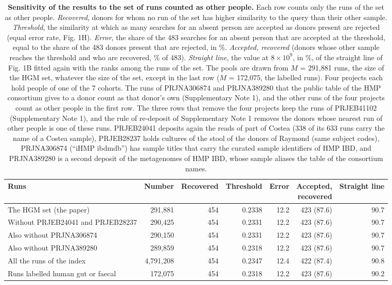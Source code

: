 \documentclass[11pt,a4paper]{article}
\begin{document}
\setcounter{table}{3}
\begin{table}[!htbp]\centering\footnotesize\setlength{\tabcolsep}{4pt}
\caption[Sensitivity of the results to the set of runs counted as other people]{\textbf{Sensitivity of the results to the set of runs counted as other people.} Each row counts only the runs of the set as other people. \textit{Recovered}, donors for whom no run of the set has higher similarity to the query than their other sample. \textit{Threshold}, the similarity at which as many searches for an absent person are accepted as donors present are rejected (equal error rate, Fig. 1H). \textit{Error}, the share of the 483 searches for an absent person that are accepted at the threshold, equal to the share of the 483 donors present that are rejected, in \%. \textit{Accepted, recovered} (donors whose other sample reaches the threshold and who are recovered, \% of 483). \textit{Straight line}, the value at $8\times10^9$, in \%, of the straight line of Fig. 1B fitted again with the ranks among the runs of the set. The pools are drawn from $M$ = 291,881 runs, the size of the HGM set, whatever the size of the set, except in the last row ($M$ = 172,075, the labelled runs). Four projects each hold people of one of the 7 cohorts. The runs of PRJNA306874 and PRJNA389280 that the public table of the HMP consortium gives to a donor count as that donor's own (Supplementary Note 1), and the other runs of the four projects count as other people in the first row. The three rows that remove the four projects keep the runs of PRJEB41102 (Supplementary Note 1), and the rule of re-deposit of Supplementary Note 1 removes the donors whose nearest run of other people is one of these runs. PRJEB24041 deposits again the reads of part of Costea (338 of its 633 runs carry the name of a Costea sample), PRJEB28237 holds cultures of the stool of the donors of Raymond (same subject codes), PRJNA306874 (``iHMP ibdmdb'') has sample titles that carry the curated sample identifiers of HMP IBD, and PRJNA389280 is a second deposit of the metagenomes of HMP IBD, whose sample aliases the table of the consortium names.}
\begin{tabular}{lrrrrrr}
\toprule
Runs & Number & Recovered & Threshold & Error & \makecell[rb]{Accepted,\\recovered} & Straight line \\
\midrule
The HGM set (the paper) & 291,881 & 454 & 0.2338 & 12.2 & 423 (87.6) & 90.7 \\
Without PRJEB24041 and PRJEB28237 & 290,425 & 454 & 0.2331 & 12.2 & 423 (87.6) & 90.7 \\
Also without PRJNA306874 & 290,150 & 454 & 0.2331 & 12.2 & 423 (87.6) & 90.7 \\
Also without PRJNA389280 & 289,859 & 454 & 0.2318 & 12.2 & 423 (87.6) & 90.7 \\
All the runs of the index & 4,791,208 & 454 & 0.2347 & 12.4 & 422 (87.4) & 90.8 \\
Runs labelled human gut or faecal & 172,075 & 454 & 0.2318 & 12.2 & 423 (87.6) & 90.2 \\
\bottomrule
\end{tabular}
\end{table}
\end{document}
